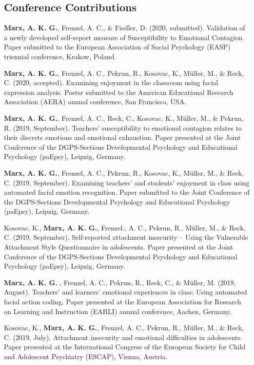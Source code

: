 \documentclass[letterpaper]{article}
\renewenvironment{itemize}{ %
  \begin{list}{}{ %
    \setlength{\leftmargin}{2.5em} %
  }
}{
  \end{list}
}
\begin{document}
\subsection*{Conference Contributions}
\begin{itemize}
\item {\bf Marx, A. K. G.}, Frenzel, A. C., \& Fiedler, D. (2020, submitted). Validation of a newly developed self-report measure of Susceptibility to Emotional Contagion. Paper submitted to the European Association of Social Psychology (EASP) triennial conference, Krakow, Poland.
\item {\bf Marx, A. K. G.}, Frenzel, A. C., Pekrun, R., Kosovac, K., Müller, M., \& Reck, C. (2020, accepted). Examining enjoyment in the classroom using facial expression analysis. Poster submitted to the American Educational Research Association (AERA) annual conference, San Francisco, USA.
\item {\bf Marx, A. K. G.}, Frenzel, A. C., Reck, C., Kosovac, K., Müller, M., \& Pekrun, R. (2019, September). Teachers’ susceptibility to emotional contagion relates to their discrete emotions and emotional exhaustion. Paper presented at the Joint Conference of the DGPS-Sections Developmental Psychology and Educational Psychology (paEpsy), Leipzig, Germany.
\item {\bf Marx, A. K. G.}, Frenzel, A. C., Pekrun, R., Kosovac, K., Müller, M., \& Reck, C. (2019, September). Examining teachers’ and students’ enjoyment in class using automated facial emotion recognition. Paper submitted to the Joint Conference of the DGPS-Sections Developmental Psychology and Educational Psychology (paEpsy), Leipzig, Germany.
\item Kosovac, K., {\bf Marx, A. K. G.}, Frenzel., A. C., Pekrun, R., Müller, M., \& Reck, C. (2019, September). Self-reported attachment insecurity – Using the Vulnerable Attachment Style Questionnaire in adolescents. Paper presented at the Joint Conference of the DGPS-Sections Developmental Psychology and Educational Psychology (paEpsy), Leipzig, Germany.
\item {\bf Marx, A. K. G. }, Frenzel, A. C., Pekrun, R., Reck, C., \& Müller, M. (2019, August). Teachers’ and learners’ emotional experiences in class: Using automated facial action coding. Paper presented at the European Association for Research on Learning and Instruction (EARLI) annual conference, Aachen, Germany.
\item Kosovac, K., {\bf Marx, A. K. G.}, Frenzel, A. C., Pekrun, R., Müller, M., \& Reck, C. (2019, July). Attachment insecurity and emotional difficulties in adolescents. Paper presented at the International Congress of the European Society for Child and Adolescent Psychiatry (ESCAP), Vienna, Austria.

\end{itemize}
\end{document}
